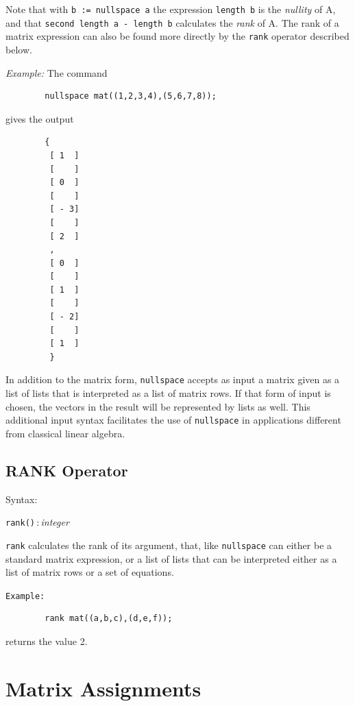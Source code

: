 Note that with \texttt{b := nullspace a} the expression \texttt{length b} is
the \emph{nullity} of A, and that \texttt{second length a - length b}
calculates the \emph{rank} of A.  The rank of a matrix expression can also
be found more directly by the \texttt{rank} operator described below.

\textit{Example:} The command
\begin{verbatim}
        nullspace mat((1,2,3,4),(5,6,7,8));
\end{verbatim}
   gives the output

\begin{verbatim}
        {
         [ 1  ]
         [    ]
         [ 0  ]
         [    ]
         [ - 3]
         [    ]
         [ 2  ]
         ,
         [ 0  ]
         [    ]
         [ 1  ]
         [    ]
         [ - 2]
         [    ]
         [ 1  ]
         }
\end{verbatim}

In addition to the {\REDUCE} matrix form, \texttt{nullspace} accepts
as input a matrix given as a list of lists that is interpreted as a
list of matrix rows.  If that form of input is chosen, the vectors in
the result will be represented by lists as well.  This additional
input syntax facilitates the use of \texttt{nullspace} in applications
different from classical linear algebra.

\subsection{RANK Operator}
\hypertarget{operator:RANK}{}

Syntax:
\begin{syntax}
  \texttt{rank(}\texttt{)}\,:\,\textit{integer}
\end{syntax}
\texttt{rank} calculates the rank of its argument, that, like \texttt{nullspace}
can either be a standard matrix expression, or a list of lists that can
be interpreted either as a list of matrix rows or a set of equations.

\texttt{Example:}
\begin{verbatim}
        rank mat((a,b,c),(d,e,f));
\end{verbatim}
returns the value 2.

\section{Matrix Assignments} 

